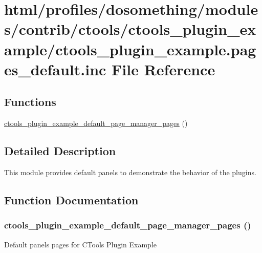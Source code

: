 \hypertarget{ctools__plugin__example_8pages__default_8inc}{
\section{html/profiles/dosomething/modules/contrib/ctools/ctools\_\-plugin\_\-example/ctools\_\-plugin\_\-example.pages\_\-default.inc File Reference}
\label{ctools__plugin__example_8pages__default_8inc}
}
\subsection*{Functions}
\begin{DoxyCompactItemize}
\item 
\hyperlink{ctools__plugin__example_8pages__default_8inc_a6ad6ed5f970cbc6919d01b2cf8d3f0b1}{ctools\_\-plugin\_\-example\_\-default\_\-page\_\-manager\_\-pages} ()
\end{DoxyCompactItemize}


\subsection{Detailed Description}
This module provides default panels to demonstrate the behavior of the plugins. 

\subsection{Function Documentation}
\hypertarget{ctools__plugin__example_8pages__default_8inc_a6ad6ed5f970cbc6919d01b2cf8d3f0b1}{
\subsubsection[{ctools\_\-plugin\_\-example\_\-default\_\-page\_\-manager\_\-pages}]{\setlength{\rightskip}{0pt plus 5cm}ctools\_\-plugin\_\-example\_\-default\_\-page\_\-manager\_\-pages ()}}
\label{ctools__plugin__example_8pages__default_8inc_a6ad6ed5f970cbc6919d01b2cf8d3f0b1}
Default panels pages for CTools Plugin Example

